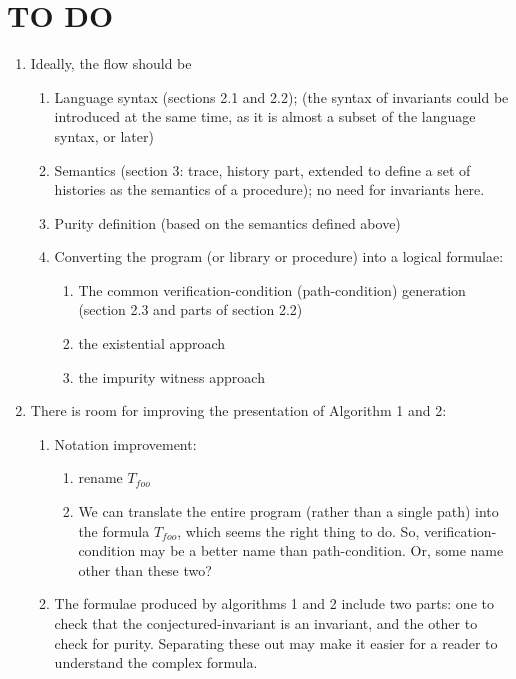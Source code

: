 \section*{TO DO}

\begin{enumerate}

\item Ideally, the flow should be
\begin{enumerate}
\item Language syntax (sections 2.1 and 2.2); (the syntax of invariants could be
introduced at the same time, as it is almost a subset of the language syntax, or later)

\item Semantics (section 3: trace, history part, extended to define a set of histories
as the semantics of a procedure); no need for invariants here.

\item Purity definition (based on the semantics defined above)

\item Converting the program (or library or procedure) into a logical formulae:
\begin{enumerate}
\item The common verification-condition (path-condition) generation (section 2.3
and parts of section 2.2)
\item the existential approach
\item the impurity witness approach
\end{enumerate}

\end{enumerate}


\item There is room for improving the presentation of Algorithm 1 and 2:
\begin{enumerate}

\item Notation improvement:
\begin{enumerate}
\item rename $T_{foo}$
\item We can translate the entire program (rather than a single path)
into the formula $T_{foo}$, which seems the right thing to do. So,
verification-condition may be a better name than path-condition.
Or, some name other than these two?
\end{enumerate}

\item The formulae produced by algorithms 1 and 2 include two parts:
one to check that the conjectured-invariant is an invariant, and the
other to check for purity. Separating these out may make it easier for
a reader to understand the complex formula.


\end{enumerate}
\end{enumerate}
